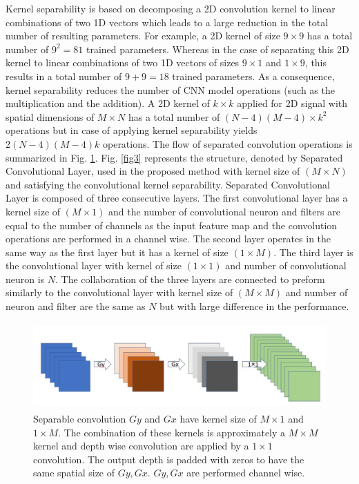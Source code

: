 Kernel separability\cite{rigamonti2013learning} \cite{szegedy2017inception} is based on decomposing a 2D convolution kernel to  linear combinations of two 1D vectors which leads to a large reduction in  the total number of resulting parameters. For example, a 2D kernel of size $9 \times 9$ has a total number of $9^2 = 81$  trained parameters. Whereas in the case of separating this 2D kernel to  linear combinations of two 1D vectors of sizes $9 \times 1$ and $1 \times 9$, this results in a total number of  $9 + 9 = 18$ trained parameters. As a consequence, kernel separability reduces the number of  CNN model operations (such as the multiplication and the addition). A  2D kernel of $k \times k$ applied for 2D signal with spatial dimensions of $ M \times N$ has a total number of  $(N-4)(M-4)\times k^2$ operations but in case of  applying kernel separability  yields $2(N-4)(M-4)k$ operations. The flow of separated convolution operations is summarized in Fig. \ref{fig2}. Fig. \ref{fig3} represents the structure, denoted by Separated Convolutional Layer, used in the proposed method with kernel size of $(M\times N)$ and satisfying the convolutional kernel separability. Separated Convolutional Layer is composed of three consecutive layers. The first convolutional layer has a kernel size of $(M\times1)$ and the number of convolutional neuron and  filters are equal to the number of channels as the input feature map and the convolution operations are performed in a channel wise. The second layer  operates in the same way as the first layer but it has a kernel of size $(1\times M)$. The third layer is the convolutional layer with kernel of size $(1\times1)$ and number of convolutional neuron is $N$. The collaboration of the three layers are  connected to preform similarly to the convolutional layer with kernel size of $(M\times M)$ and number of neuron and filter are the same as $N$ but with large difference in the performance.


\begin{figure}
\begin{center}
\includegraphics[height=33mm,width=14.0cm]{Figures/fig2.jpg}
\caption{Separable convolution  $Gy$ and $Gx$ have kernel size of $M\times1$ and $1 \times M$. The combination of these kernels is approximately a $M\times M$ kernel  and depth wise convolution are applied by a $1\times1$ convolution. The output depth  is padded with zeros to have the same spatial size of  $Gy, Gx$. $Gy, Gx$ are performed channel wise. }
\end{center}
\label{fig2}
\end{figure}


